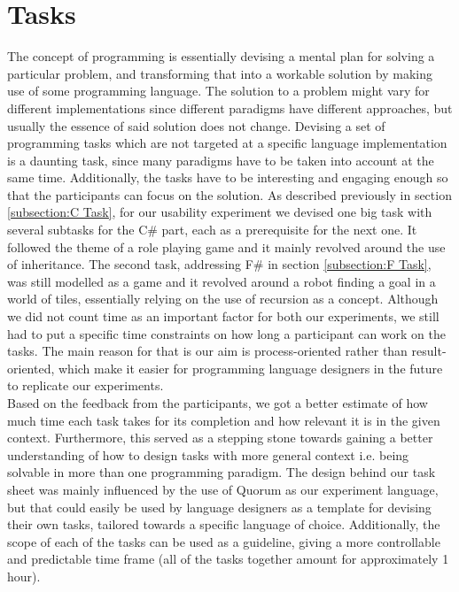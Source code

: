 \section{Tasks}
The concept of programming is essentially devising a mental plan for solving a particular problem, and transforming that into a workable solution by making use of some programming language. The solution to a problem might vary for different implementations since different paradigms have different approaches, but usually the essence of said solution does not change. Devising a set of programming tasks which are not targeted at a specific language implementation is a daunting task, since many paradigms have to be taken into account at the same time. Additionally, the tasks have to be interesting and engaging enough so that the participants can focus on the solution. As described previously in section \ref{subsection:C Task}, for our usability experiment we devised one big task with several subtasks for the C\# part, each as a prerequisite for the next one. It followed the theme of a role playing game and it mainly revolved around the use of inheritance. The second task, addressing F\# in section \ref{subsection:F Task}, was still modelled as a game and it revolved around a robot finding a goal in a world of tiles, essentially relying on the use of recursion as a concept. Although we did not count time as an important factor for both our experiments, we still had to put a specific time constraints on how long a participant can work on the tasks. The main reason for that is our aim is process-oriented rather than result-oriented, which make it easier for programming language designers in the future to replicate our experiments.\\ Based on the feedback from the participants, we got a better estimate of how much time each task takes for its completion and how relevant it is in the given context. Furthermore, this served as a stepping stone towards gaining a better understanding of how to design tasks with more general context i.e. being solvable in more than one programming paradigm. The design behind our task sheet was mainly influenced by the use of Quorum as our experiment language, but that could easily be used by language designers as a template for devising their own tasks, tailored towards a specific language of choice. Additionally, the scope of each of the tasks  can be used as a guideline, giving a more controllable and predictable time frame (all of the tasks together amount for approximately 1 hour). 

